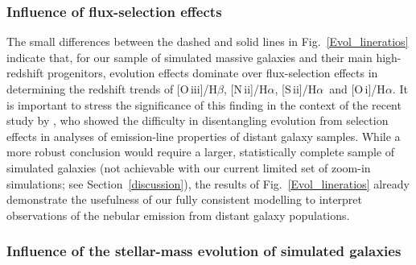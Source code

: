 \documentclass[fleqn,usenatbib]{mnras}
\newcommand{\oiiihb}{\hbox{[O\,{\sc iii}]/H$\beta$}}
\newcommand{\niiha}{\hbox{[N\,{\sc ii}]/H$\alpha$}}
\newcommand{\siiha}{\hbox{[S\,{\sc ii}]/H$\alpha$}}
\newcommand{\oiha}{\hbox{[O\,{\sc i}]/H$\alpha$}}
\begin{document}
\subsubsection{Influence of flux-selection effects}\label{selection}

The small differences between the dashed and solid lines in
Fig.~\ref{Evol_lineratios} indicate that, for our sample of simulated
massive galaxies and their main high-redshift  progenitors, evolution
effects dominate over flux-selection effects in determining the
redshift trends of \oiiihb, \niiha, \siiha\ and \oiha. It is important
to stress the significance of this finding in the context of the
recent study by \citet{Juneau14}, who showed the difficulty in
disentangling evolution from selection effects in analyses of
emission-line  properties of distant galaxy samples. While a more
robust conclusion would require a  larger, statistically complete
sample of simulated galaxies (not achievable with our current  limited
set of zoom-in simulations; see Section~\ref{discussion}), the results
of Fig.~\ref{Evol_lineratios} already demonstrate the usefulness of
our fully consistent modelling  to interpret observations of the
nebular emission from distant galaxy populations. 

\subsubsection{Influence of the stellar-mass evolution of simulated galaxies}\label{massbias}
\end{document}
